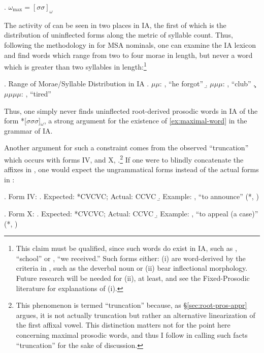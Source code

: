 \documentclass[12pt,twoside,letterpaper]{article}
\begin{document}
\ex. \label{ex:maximal-word}$\omega_{\textrm{max}} = [\sigma\sigma]_{\omega}$

The activity of \Last can be seen in two places in IA, the first of which is the distribution of uninflected forms along the metric of syllable count. Thus, following the methodology in \cite{mccarthy90} for MSA nominals, one can examine the IA lexicon and find words which range from two to four morae in length, but never a word which is greater than two syllables in length:\footnote{This claim must be qualified, since such words do exist in IA, such as {\em {}}, ``school'' or {\em {}}, ``we received.'' Such forms either: (i) are word-derived by the criteria in \cite{arad05}, such as the deverbal noun {\em {}} or (ii) bear inflectional morphology. Future research will be needed for (ii), at least, and see the Fixed-Prosodic literature \citep{ussishkin00,ussishkin05} for explanations of (i).}

\ex. Range of Morae/Syllable Distribution in IA \citep[40--1]{erwin04}
\a. $\mu\mu$: {\em {}}, ``he forgot''
\b. $\mu\mu\mu$: {\em {}}, ``club''
\c. $\mu\mu\mu\mu$: {\em {}}, ``tired''

Thus, one simply never finds uninflected root-derived prosodic words in IA of the form *[$\sigma\sigma\sigma$]$_\omega$, a strong argument for the existence of \ref{ex:maximal-word} in the grammar of IA.

Another argument for such a constraint comes from the observed ``truncation'' which occurs with forms IV, {\em {}} and X, {\em {}}.\footnote{This phenomenon is termed ``truncation'' because, as \S{\ref{sec:root-pros-appr}} argues, it is not actually truncation but rather an alternative linearization of the first affixal vowel. This distinction matters not for the point here concerning maximal prosodic words, and thus I follow \cite[ch.6]{ussishkin00} in calling such facts ``truncation'' for the sake of discussion.} If one were to blindly concatenate the affixes in \cite[ch.6]{ussishkin00}, one would expect the ungrammatical forms instead of the actual forms in \Next:


\ex. Form IV:
\a. Expected: *CVCVC; Actual: CCVC
\b. Example: , ``to announce'' (*, \cite[p.67]{erwin04})

\ex. Form X:
\a. Expected: *CVCVC; Actual: CCVC
\b. Example: , ``to appeal (a case)'' (*, \cite[p.76]{erwin04})
\end{document}
